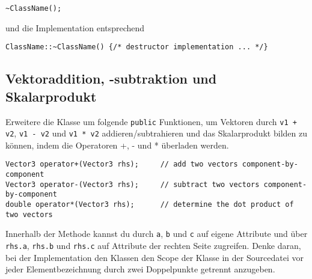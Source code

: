 \begin{lstlisting}
~ClassName();
\end{lstlisting}

und die Implementation entsprechend

\begin{lstlisting}
ClassName::~ClassName() {/* destructor implementation ... */}
\end{lstlisting}


\subsection{Vektoraddition, -subtraktion und Skalarprodukt}
Erweitere die Klasse um folgende \texttt{public} Funktionen, um Vektoren durch \texttt{v1 + v2}, \texttt{v1 - v2} und \texttt{v1 * v2} addieren/subtrahieren und das Skalarprodukt bilden zu können, indem die Operatoren +, - und * überladen werden.

\begin{lstlisting}
Vector3 operator+(Vector3 rhs);		// add two vectors component-by-component
Vector3 operator-(Vector3 rhs);		// subtract two vectors component-by-component
double operator*(Vector3 rhs);		// determine the dot product of two vectors
\end{lstlisting}

Innerhalb der Methode kannst du durch \texttt{a}, \texttt{b} und \texttt{c} auf eigene Attribute und über  \texttt{rhs.a}, \texttt{rhs.b} und \texttt{rhs.c} auf Attribute der rechten Seite zugreifen. Denke daran, bei der Implementation den Klassen den Scope der Klasse in der Sourcedatei vor jeder Elementbezeichnung durch zwei Doppelpunkte getrennt anzugeben.


